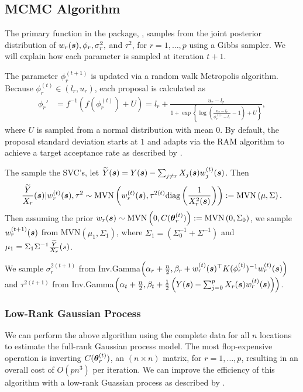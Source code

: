 \subsection{MCMC Algorithm}
\label{sec:mcmc}
The primary function in the  package, , samples from the joint posterior distribution of $w_r(\boldsymbol{s}), \phi_r, \sigma_r^2,$ and $\tau^2$, for $r = 1, \dots, p$ using a Gibbs sampler. We will explain how each parameter is sampled at iteration $t+1$.

The parameter $\phi_r^{(t+1)}$ is updated via a random walk Metropolis algorithm. Because $\phi_r^{(t)} \in (l_r, u_r)$, each proposal is calculated as 
\begin{align*}
    \phi_r' &= f^{-1}(f(\phi_r^{(t)}) + U) = l_r + \frac{u_r - l_r}{1 + \exp\left\{\log\left(\frac{u_r - l_r}{\phi_r^{(t)} - l_r} - 1\right) + U\right\}},
\end{align*}
where $U$ is sampled from a normal distribution with mean $0$. By default, the proposal standard deviation starts at $1$ and adapts via the RAM algorithm to achieve a target acceptance rate as described by \cite{vihola}.

The sample the SVC's, let $\widetilde{Y}(\boldsymbol{s}) = Y(\boldsymbol{s}) - \sum_{j\neq r} X_j(\boldsymbol{s})w_j^{(t)}(\boldsymbol{s})$. Then
\begin{align*}
    \frac{\widetilde{Y}}{X_r}(\boldsymbol{s}) | w_r^{(t)}(\boldsymbol{s}), \tau^2 \sim \text{MVN} \left(w_r^{(t)}(\boldsymbol{s}), \tau^{2(t)} \text{diag}\left( \frac{1}{X_r^2(\boldsymbol{s})} \right)\right) := \text{MVN} \left(\mu, \Sigma\right).
\end{align*}
Then assuming the prior $w_r(\boldsymbol{s}) \sim \text{MVN}\left(0, C(\boldsymbol{\theta}_r^{(t)})\right) := \text{MVN}\left(0, \Sigma_0\right)$, we sample $w_r^{(t+1)}(\boldsymbol{s})$ from MVN$(\mu_1, \Sigma_1)$, where $\Sigma_1 = \left(\Sigma_0^{-1} + \Sigma^{-1}\right)$ and $\mu_1 = \Sigma_1 \Sigma^{-1} \frac{\widetilde{Y}}{X_r}(s)$.

We sample $\sigma_r^{2(t+1)}$ from Inv.Gamma$\left(\alpha_r + \frac{n}{2}, \beta_r + w_r^{(t)}(\boldsymbol{s})^{\top} K(\phi_r^{(t)})^{-1} w_r^{(t)}(\boldsymbol{s})\right)$ and $\tau^{2(t+1)}$ from Inv.Gamma$\left(\alpha_t + \frac{n}{2}, \beta_t + \frac{1}{2} \left(Y(\boldsymbol{s}) - \sum_{j=0}^p X_r(\boldsymbol{s})w_r^{(t)}(\boldsymbol{s}) \right)\right)$.

\subsubsection{Low-Rank Gaussian Process}
\label{sec:low_rank}

We can perform the above algorithm using the complete data for all $n$ locations to estimate the full-rank Gaussian process model. The most flop-expensive operation is inverting $C(\boldsymbol{\theta}_r^{(t)})$, an $(n \times n)$ matrix, for $r = 1, \dots, p$, resulting in an overall cost of $O(pn^3)$ per iteration. We can improve the efficiency of this algorithm with a low-rank Guassian process as described by \cite{banerjee}.

